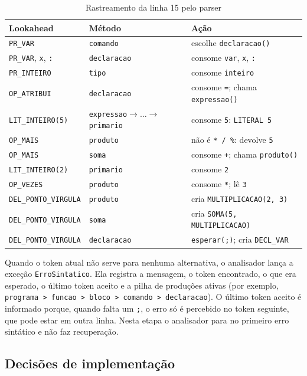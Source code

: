 \documentclass[conference,a4paper]{IEEEtran}
\newcommand{\cod}[1]{\texttt{#1}}
\begin{document}
\begin{table}[t]
\caption{Rastreamento da linha 15 pelo parser}
\label{tab:rastro}
\centering
\footnotesize
\begin{tabular}{@{}lll@{}}
\toprule
Lookahead & Método & Ação \\
\midrule
\cod{PR\_VAR} & \cod{comando} & escolhe \cod{declaracao()} \\
\cod{PR\_VAR}, \cod{x}, \cod{:} & \cod{declaracao} & consome \cod{var}, \cod{x}, \cod{:} \\
\cod{PR\_INTEIRO} & \cod{tipo} & consome \cod{inteiro} \\
\cod{OP\_ATRIBUI} & \cod{declaracao} & consome \cod{=}; chama \cod{expressao()} \\
\cod{LIT\_INTEIRO(5)} & \cod{expressao}$\rightarrow\ldots\rightarrow$\cod{primario} & consome \cod{5}: \cod{LITERAL 5} \\
\cod{OP\_MAIS} & \cod{produto} & não é \cod{* / \%}: devolve \cod{5} \\
\cod{OP\_MAIS} & \cod{soma} & consome \cod{+}; chama \cod{produto()} \\
\cod{LIT\_INTEIRO(2)} & \cod{primario} & consome \cod{2} \\
\cod{OP\_VEZES} & \cod{produto} & consome \cod{*}; lê \cod{3} \\
\cod{DEL\_PONTO\_VIRGULA} & \cod{produto} & cria \cod{MULTIPLICACAO(2, 3)} \\
\cod{DEL\_PONTO\_VIRGULA} & \cod{soma} & cria \cod{SOMA(5, MULTIPLICACAO)} \\
\cod{DEL\_PONTO\_VIRGULA} & \cod{declaracao} & \cod{esperar(;)}; cria \cod{DECL\_VAR} \\
\bottomrule
\end{tabular}
\end{table}

Quando o token atual não serve para nenhuma alternativa, o analisador lança a exceção \cod{ErroSintatico}. Ela registra a mensagem, o token encontrado, o que era esperado, o último token aceito e a pilha de produções ativas (por exemplo, \cod{programa > funcao > bloco > comando > declaracao}). O último token aceito é informado porque, quando falta um \cod{;}, o erro só é percebido no token seguinte, que pode estar em outra linha. Nesta etapa o analisador para no primeiro erro sintático e não faz recuperação.

\subsection{Decisões de implementação}
\end{document}
